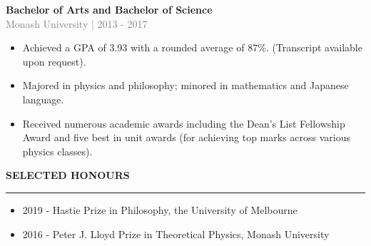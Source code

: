 \documentclass[12pt]{article}
\begin{document}
\vspace{0.5cm}
{\bf Bachelor of Arts and Bachelor of Science} \\
\textcolor{gray}{Monash University | 2013 - 2017}
\begin{small}
\begin{itemize}
  \item Achieved a GPA of 3.93 with a rounded average of 87\%. (Transcript available upon request).
  \item Majored in physics and philosophy; minored in mathematics and Japanese language.
  \item Received numerous academic awards including the Dean's List Fellowship Award and five best in unit awards (for achieving top marks across various physics classes).
\end{itemize}
\end{small}

\vspace{1cm}
\begin{large}
{\bf SELECTED HONOURS} \\
\textcolor{gray}{\rule{2cm}{2mm}}
\end{large}
\begin{small}
\begin{itemize}
  \item 2019 - Hastie Prize in Philosophy, the University of Melbourne
  \item 2016 - Peter J. Lloyd Prize in Theoretical Physics, Monash University
\end{itemize}
\end{small}
\end{document}
